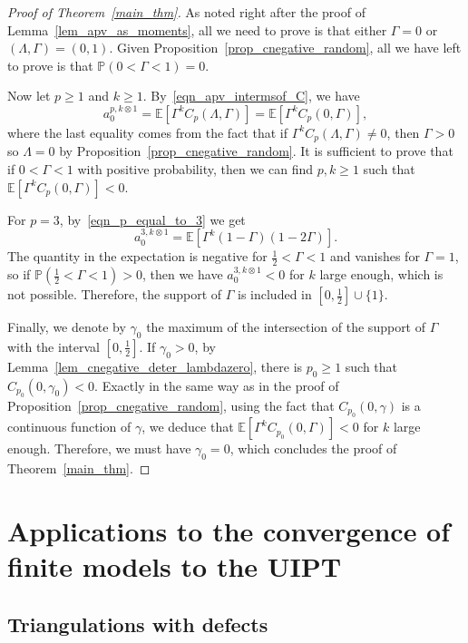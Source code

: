 \documentclass[AHL,Unicode,longabstracts,published]{cedram}
\newcommand{\E}{\mathbb{E}}
\renewcommand{\P}{\mathbb{P}}
\begin{document}
\begin{proof}[Proof of Theorem~\ref{main_thm}]
As noted right after the proof of Lemma~\ref{lem_apv_as_moments}, all we need to prove is that either $\Gamma=0$ or $(\Lambda, \Gamma)=(0,1)$. Given Proposition~\ref{prop_cnegative_random}, all we have left to prove is that $\P \left(0<\Gamma<1 \right)=0$.

Now let $p \geq 1$ and $k \geq 1$. By~\eqref{eqn_apv_intermsof_C}, we have
\[
a_0^{p, k \otimes 1} = \E \left[\Gamma^{k} C_p(\Lambda, \Gamma) \right] = \E \left[\Gamma^{k} C_p(0, \Gamma) \right],
\]
where the last equality comes from the fact that if $\Gamma^{k} C_p(\Lambda, \Gamma) \ne 0$, then $\Gamma>0$ so $\Lambda=0$ by Proposition~\ref{prop_cnegative_random}. It is sufficient to prove that if $0<\Gamma<1$ with positive probability, then we can find $p,k \geq 1$ such that $\E [\Gamma^{k} C_p(0, \Gamma)]<0$.

For $p=3$, by~\eqref{eqn_p_equal_to_3} we get
\[
a_0^{3, k \otimes 1} = \E \left[\Gamma^{k} (1-\Gamma)(1-2\Gamma) \right].
\]
The quantity in the expectation is negative for $\frac{1}{2}<\Gamma<1$ and vanishes for $\Gamma=1$, so if $\P (\frac{1}{2} < \Gamma < 1 )>0$, then we have $a_0^{3, k \otimes 1}<0$ for $k$ large enough, which is not possible. Therefore, the support of $\Gamma$ is included in $[0,\frac{1}{2}] \cup \{1\}$.

Finally, we denote by $\gamma_0$ the maximum of the intersection of the support of $\Gamma$ with the interval $[0,\frac{1}{2}]$. If $\gamma_0>0$, by Lemma~\ref{lem_cnegative_deter_lambdazero}, there is $p_0 \geq 1$ such that $C_{p_0}(0,\gamma_0)<0$. Exactly in the same way as in the proof of Proposition~\ref{prop_cnegative_random}, using the fact that $C_{p_0}(0,\gamma)$ is a continuous function of $\gamma$, we deduce that $\E [\Gamma^{k} C_{p_0}(0, \Gamma)]<0$ for $k$ large enough. Therefore, we must have $\gamma_0=0$, which concludes the proof of Theorem~\ref{main_thm}.
\end{proof}

\section{Applications to the convergence of finite models to the UIPT}

\subsection{Triangulations with defects}
\end{document}
